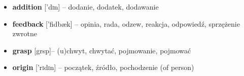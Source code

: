 \documentclass[a4paper,12pt]{book}
\begin{document}
\begin{itemize}
    \item \textbf{addition} [{\textschwa}'d{\textsc{i}}{\textesh}{\textschwa}n] – dodanie, dodatek, dodawanie
    \item \textbf{feedback} [’fi{\textlengthmark}db{\ae}k] – opinia, rada, odzew, reakcja, odpowiedź, sprzężenie zwrotne
    \item \textbf{grasp} [gr{\textscripta}{\textlengthmark}sp]– (u)chwyt, chwytać, pojmowanie, pojmować
    \item \textbf{origin} [’{\textopeno}r{\textsc{i}}d{\textyogh}{\textsc{i}}n] – początek,  źródło, pochodzenie (of person)
\end{itemize}
 
 
 
\end{document}
